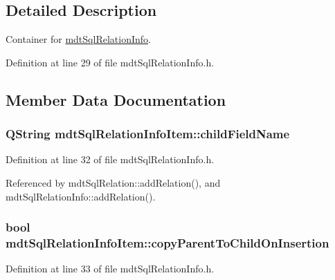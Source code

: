\subsection{Detailed Description}
Container for \hyperlink{classmdt_sql_relation_info}{mdt\-Sql\-Relation\-Info}. 

Definition at line 29 of file mdt\-Sql\-Relation\-Info.\-h.



\subsection{Member Data Documentation}
\hypertarget{structmdt_sql_relation_info_item_a472e45de5f24377bb92740ece7f34a07}{
\subsubsection[{child\-Field\-Name}]{\setlength{\rightskip}{0pt plus 5cm}Q\-String mdt\-Sql\-Relation\-Info\-Item\-::child\-Field\-Name}}\label{structmdt_sql_relation_info_item_a472e45de5f24377bb92740ece7f34a07}


Definition at line 32 of file mdt\-Sql\-Relation\-Info.\-h.



Referenced by mdt\-Sql\-Relation\-::add\-Relation(), and mdt\-Sql\-Relation\-Info\-::add\-Relation().

\hypertarget{structmdt_sql_relation_info_item_ad0c6a47d4463fd80f1696bbfc6c3b402}{
\subsubsection[{copy\-Parent\-To\-Child\-On\-Insertion}]{\setlength{\rightskip}{0pt plus 5cm}bool mdt\-Sql\-Relation\-Info\-Item\-::copy\-Parent\-To\-Child\-On\-Insertion}}\label{structmdt_sql_relation_info_item_ad0c6a47d4463fd80f1696bbfc6c3b402}


Definition at line 33 of file mdt\-Sql\-Relation\-Info.\-h.



